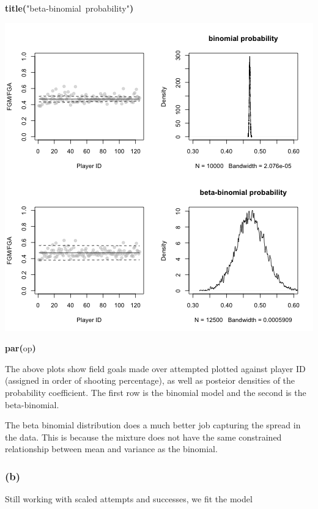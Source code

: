 \documentclass{article}
\makeatletter
\newcommand{\hlfunctioncall}[1]{\textcolor[rgb]{.5,0,.33}{\textbf{#1}}}%
\newcommand{\hlstring}[1]{\textcolor[rgb]{.6,.6,1}{#1}}%
\newcommand{\hlkeyword}[1]{\textbf{#1}}%
\newcommand{\hlsymbol}[1]{#1}%
\newcommand{\hlstd}[1]{\textcolor[rgb]{0,0,0}{#1}}%
\newenvironment{kframe}{%
 \def\FrameCommand##1{\hskip\@totalleftmargin \hskip-\fboxsep
 \colorbox{shadecolor}{##1}\hskip-\fboxsep
     \hskip-\linewidth \hskip-\@totalleftmargin \hskip\columnwidth}%
 \MakeFramed {\advance\hsize-\width
   \@totalleftmargin\z@ \linewidth\hsize
   \@setminipage}}%
 {\par\unskip\endMakeFramed}
\newenvironment{knitrout}{}{} %
\makeatother
\begin{document}
\begin{knitrout}
{\begin{kframe}
\begin{flushleft}
\hlstd{}\hlfunctioncall{title}\hlkeyword{(}\hlstring{"beta-binomial{\ }probability"}\hlkeyword{)}\mbox{}
\normalfont
\end{flushleft}
\includegraphics{post-bs} \begin{flushleft}
\ttfamily\noindent
\hlfunctioncall{par}\hlkeyword{(}\hlsymbol{op}\hlkeyword{)}\mbox{}
\normalfont
\end{flushleft}
\end{kframe}}
\end{knitrout}


The above plots show field goals made over attempted plotted against player ID (assigned in order of shooting percentage), as well as posteior densities of the probability coefficient. 
The first row is the binomial model and the second is the beta-binomial.

The beta binomial distribution does a much better job capturing the spread in the data. 
This is because the mixture does not have the same constrained relationship between mean and variance as the binomial.

\subsubsection{(b)}

Still working with scaled attempts and successes, we fit the model 
\end{document}
